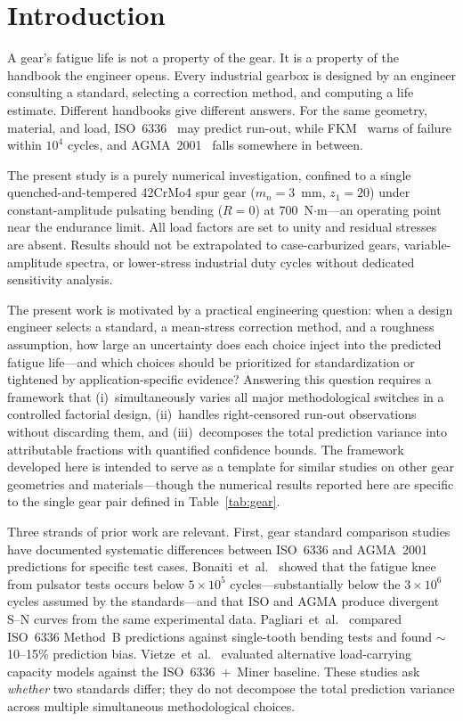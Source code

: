 \documentclass[12pt,a4paper]{article}
\begin{document}
\section{Introduction}
\label{sec:intro}

A gear's fatigue life is not a property of the gear. It is a property
of the handbook the engineer opens. Every industrial gearbox is designed
by an engineer consulting a standard, selecting a correction method, and
computing a life estimate. Different handbooks give different answers.
For the same geometry, material, and load, ISO~6336~\cite{iso6336} may
predict run-out, while FKM~\cite{fkm} warns of failure within $10^4$
cycles, and AGMA~2001~\cite{agma2001} falls somewhere in between.

The present study is a purely numerical investigation, confined to a
single quenched-and-tempered 42CrMo4 spur gear ($m_n=3$~mm,
$z_1=20$) under constant-amplitude pulsating bending ($R=0$) at
700~N$\cdot$m---an operating point near the endurance limit. All
load factors are set to unity and residual stresses are absent.
Results should not be extrapolated to case-carburized gears,
variable-amplitude spectra, or lower-stress industrial duty cycles
without dedicated sensitivity analysis.

The present work is motivated by a practical engineering question:
when a design engineer selects a standard, a mean-stress correction
method, and a roughness assumption, how large an uncertainty does each
choice inject into the predicted fatigue life---and which choices
should be prioritized for standardization or tightened by
application-specific evidence? Answering this question requires a
framework that (i)~simultaneously varies all major methodological
switches in a controlled factorial design, (ii)~handles right-censored
run-out observations without discarding them, and (iii)~decomposes the
total prediction variance into attributable fractions with quantified
confidence bounds. The framework developed here is intended to serve as
a template for similar studies on other gear geometries and
materials---though the numerical results reported here are specific
to the single gear pair defined in Table~\ref{tab:gear}.

Three strands of prior work are relevant. First, gear standard
comparison studies have documented systematic differences between
ISO~6336 and AGMA~2001 predictions for specific test cases.
Bonaiti~et~al.~\cite{bonaiti2024} showed that the fatigue knee from
pulsator tests occurs below $5\times10^5$ cycles---substantially
below the $3\times10^6$ cycles assumed by the
standards---and that ISO and AGMA produce divergent S--N curves from
the same experimental data. Pagliari~et~al.~\cite{pagliari2025}
compared ISO~6336 Method~B predictions against single-tooth bending
tests and found $\sim$10--15\% prediction bias. Vietze~et~al.~\cite{vietze2024}
evaluated alternative load-carrying capacity models against the
ISO~6336~+~Miner baseline. These studies ask \emph{whether} two
standards differ; they do not decompose the total prediction variance
across multiple simultaneous methodological choices.
\end{document}
